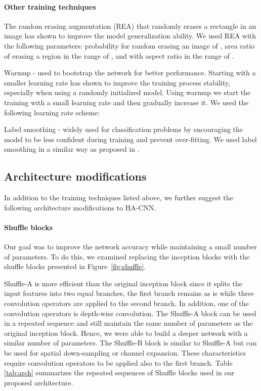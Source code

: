 \documentclass[sigconf]{acmart}
\begin{document}
\paragraph{Other training techniques}

The random erasing augmentation (REA) \cite{zhong2017random} that randomly erases a rectangle in an image has shown to improve the model generalization ability. We used REA with the following parameters: probability for random erasing an image of , area ratio of erasing a region in the range of , and with aspect ratio in the range of .

Warmup \cite{fan2019spherereid} - used to bootstrap the network for better performance. Starting with a smaller learning rate has shown to improve the training process stability, especially when using a randomly initialized model. Using warmup we start the training with a small learning rate and then gradually increase it. We used the following learning rate scheme:



Label smoothing \cite{szegedy2016rethinking} - widely used for classification problems by encouraging the model to be less confident during training and prevent over-fitting. We used label smoothing in a similar way as proposed in \cite{luo2019bag}.


\subsection{Architecture modifications}
\label{sec:architecture_modifications}
In addition to the training techniques listed above, we further suggest the following architecture modifications to HA-CNN.

\paragraph{Shuffle blocks \cite{ma2018shufflenet}}
Our goal was to improve the network accuracy while maintaining a small number of parameters. To do this, we examined replacing the inception blocks with the shuffle blocks presented in Figure~\ref{fig:shuffle}.

Shuffle-A is more efficient than the original inception block since it splits the input features into two equal branches, the first branch remains as is while three convolution operators are applied to the second branch. In addition, one of the convolution operators is depth-wise convolution. The Shuffle-A block can be used in a repeated sequence and still maintain the same number of parameters as the original inception block. Hence, we were able to build a deeper network with a similar number of parameters.
The Shuffle-B block is similar to Shuffle-A but can be used for spatial down-sampling or channel expansion. These characteristics require convolution operators to be applied also to the first branch.
Table \ref{tab:arch} summarizes the repeated sequences of Shuffle blocks used in our proposed architecture.
\end{document}
